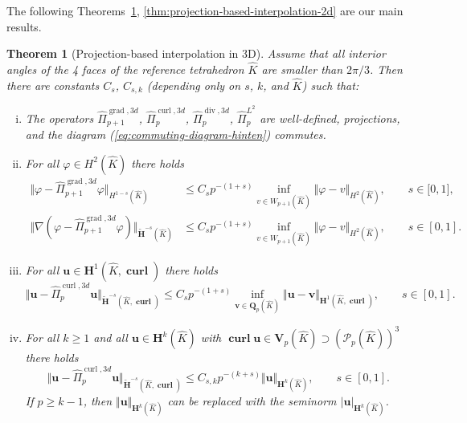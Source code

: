 \documentclass{article}
\newtheorem{theorem}{Theorem}[section]
\newcommand{\hatPicurlcom}{\widehat \Pi^{\operatorname*{curl},3d}_p}
\newcommand{\hatPigradcom}{\widehat\Pi^{\operatorname*{grad},3d}_{p+1}}
\newcommand{\hatPidivcom}{\widehat\Pi^{\operatorname*{div},3d}_{p}}
\begin{document}
The following Theorems~\ref{thm:projection-based-interpolation}, 
\ref{thm:projection-based-interpolation-2d} are our main results. 
\begin{theorem}[Projection-based interpolation in 3D]
\label{thm:projection-based-interpolation} 
Assume that all interior angles of the 4 faces of the reference tetrahedron
$\widehat K$ are smaller than $2\pi/3$. Then  there are constants $C_s$, $C_{s,k}$ 
(depending only on $s$, $k$, and $\widehat K$) such that: 

\begin{enumerate}
[(i)]
\item 
\label{item:thm:projection-based-interpolation-i} 
The operators $\hatPigradcom$, $\hatPicurlcom$, $\hatPidivcom$, $\widehat{\Pi}^{L^2}_p$ are well-defined, 
projections, and the diagram (\ref{eq:commuting-diagram-hinten}) commutes.

\item 
\label{item:thm:projection-based-interpolation-iii} 
For all $\varphi\in H^{2}(\widehat{K})$ there holds
\begin{align*}
\Vert\varphi-\hatPigradcom\varphi\Vert
_{H^{1-s}(\widehat{K})}&\leq C_{s}p^{-(1+s)}\inf_{v\in W_{p+1}(\widehat{K})}\Vert\varphi-v\Vert_{H^{2}(\widehat{K})},\qquad
s\in\lbrack0,1], \\
\Vert \nabla(\varphi-\hatPigradcom \varphi)\Vert_{\widetilde{\mathbf{H}}^{-s}(\widehat{K})}&\leq
C_{s}p^{-(1+s)} \inf_{v \in W_{p+1}(\widehat K)} \Vert \varphi -v\Vert_{H^{2}(\widehat{K})}, \qquad s\in [0,1].
\end{align*}

\item 
\label{item:thm:projection-based-interpolation-iv} 
For all ${\mathbf{u}}\in{\mathbf{H}}^{1}(\widehat{K},\operatorname{\mathbf{curl}})$ there holds
\[
\Vert{\mathbf{u}}-\hatPicurlcom{\mathbf{u}}%
\Vert_{\widetilde{\mathbf{H}}^{-s}(\widehat{K},\operatorname{\mathbf{curl}})}\leq C_s p^{-(1+s)}%
\inf_{\mathbf{v}\in\mathbf{Q}_p(\widehat{K})}\Vert{\mathbf{u}}-{\mathbf{v}}\Vert_{\mathbf{H}^{1}(\widehat{K},\operatorname{\mathbf{curl}})}, \qquad s\in [0,1].
\]


\item 
\label{item:thm:projection-based-interpolation-v} 
For all $k\geq1$ and
all ${\mathbf{u}}\in{\mathbf{H}}^{k}(\widehat{K})$ with 
$\operatorname*{\mathbf{curl}}%
{\mathbf{u}}\in {\mathbf V}_p(\widehat K) \supset
({\mathcal{P}}_{p}(\widehat{K}))^{3}$ there holds
\begin{equation}
\Vert{\mathbf{u}}-\hatPicurlcom{\mathbf{u}}%
\Vert_{\widetilde{\mathbf{H}}^{-s}(\widehat{K},\operatorname{\mathbf{curl}})}\leq C_{s,k}p^{-(k+s)}\Vert{\mathbf{u}}\Vert
_{\mathbf{H}^{k}(\widehat{K})}, \qquad s\in [0,1].
\label{eq:lemma:projection-based-interpolation-approximation-10}%
\end{equation}
If $p\geq k-1$, then $\Vert{\mathbf{u}}\Vert_{{\mathbf{H}}%
^{k}(\widehat{K})}$ can be replaced with the seminorm $|{\mathbf{u}%
}|_{{\mathbf{H}}^{k}(\widehat{K})}$.


\end{enumerate}
\end{theorem}
\end{document}
